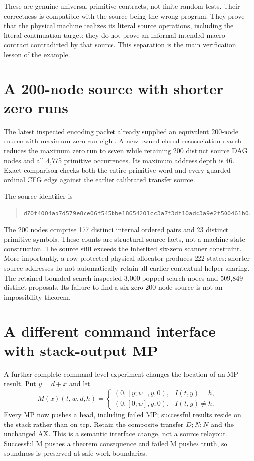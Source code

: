 \documentclass[11pt]{article}
\begin{document}
These are genuine universal primitive contracts, not finite random tests. Their correctness is compatible with the source being the wrong program. They prove that the physical machine realizes its literal source operations, including the literal continuation target; they do not prove an informal intended macro contract contradicted by that source. This separation is the main verification lesson of the example.

\section{A 200-node source with shorter zero runs}
The latest inspected encoding packet already supplied an equivalent 200-node source with maximum zero run eight. A new owned closed-reassociation search reduces the maximum zero run to seven while retaining 200 distinct source DAG nodes and all 4,775 primitive occurrences. Its maximum address depth is 46. Exact comparison checks both the entire primitive word and every guarded ordinal CFG edge against the earlier calibrated transfer source.

The source identifier is
\begin{quote}\small\ttfamily
\nolinkurl{d70f4004ab7d579e8ce06f545bbe18654201cc3a7f3df10adc3a9e2f500461b0}.
\end{quote}
The 200 nodes comprise 177 distinct internal ordered pairs and 23 distinct primitive symbols. These counts are structural source facts, not a machine-state construction. The source still exceeds the inherited six-zero scanner constraint. More importantly, a row-protected physical allocator produces 222 states: shorter source addresses do not automatically retain all earlier contextual helper sharing. The retained bounded search inspected 3,000 popped search nodes and 509,849 distinct proposals. Its failure to find a six-zero 200-node source is not an impossibility theorem.

\section{A different command interface with stack-output MP}
A further complete command-level experiment changes the location of an MP result. Put $y=d+x$ and let
\[
 M(x)(t,w,d,h)=
 \begin{cases}
 (0,[y;w],y,0),&I(t,y)=h,\\
 (0,[0;w],y,0),&I(t,y)\ne h.
 \end{cases}
\]
Every MP now pushes a head, including failed MP; successful results reside on the stack rather than on top. Retain the composite transfer $D;N;N$ and the unchanged AX. This is a semantic interface change, not a source relayout. Successful M pushes a theorem consequence and failed M pushes truth, so soundness is preserved at safe work boundaries.
\end{document}
